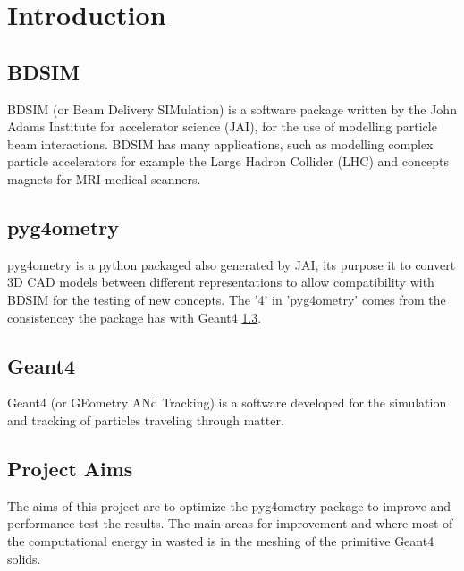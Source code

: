 \documentclass[12pt,a4paper]{article}
\begin{document}
\small
\setcounter{page}{1}
\section{Introduction}

\subsection{BDSIM}
BDSIM (or Beam Delivery SIMulation) is a software package written by the John Adams Institute for accelerator science (JAI), for the use of modelling particle beam interactions. BDSIM has many applications, such as modelling complex particle accelerators for example the Large Hadron Collider (LHC) and concepts magnets for MRI medical scanners.  

\subsection{pyg4ometry}
pyg4ometry is a python packaged also generated by JAI, its purpose it to convert 3D CAD models between different representations to allow compatibility with BDSIM for the testing of new concepts. The '4' in 'pyg4ometry' comes from the consistencey the package has with Geant4 \ref{geant4}.

\subsection{Geant4}\label{geant4}
Geant4 (or GEometry ANd Tracking) is a software developed for the simulation and tracking of particles traveling through matter.

\subsection{Project Aims}
The aims of this project are to optimize the pyg4ometry package to improve and performance test the results. The main areas for improvement and where most of the computational energy in wasted is in the meshing of the primitive Geant4 solids.
\end{document}
